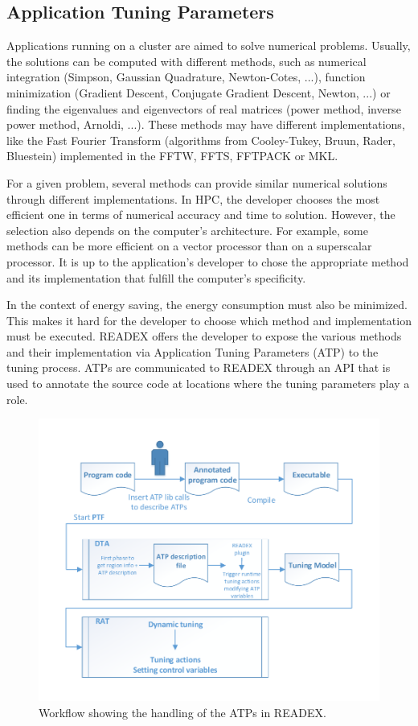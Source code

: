 \subsection{Application Tuning Parameters} \label{sec:atp}

Applications running on a cluster are aimed to solve numerical problems. Usually, the solutions can be computed with different methods, such as numerical integration (Simpson, Gaussian Quadrature, Newton-Cotes, ...), function minimization (Gradient Descent, Conjugate Gradient Descent, Newton, ...) or finding the eigenvalues and eigenvectors of real matrices (power method, inverse power method, Arnoldi, ...). These methods may have different implementations, like the Fast Fourier Transform (algorithms from Cooley-Tukey, Bruun, Rader, Bluestein) implemented in the FFTW, FFTS, FFTPACK or MKL.

For a given problem, several methods can provide similar numerical solutions through different implementations. In HPC, the developer chooses the most efficient one in terms of numerical accuracy and time to solution. However, the selection also depends on the computer's architecture. For example, some methods can be more efficient on a vector processor than on a superscalar processor. It is up to the application's developer to chose the appropriate method and its implementation that fulfill the computer's specificity.

In the context of energy saving, the energy consumption must also be minimized. This makes it hard for the developer to choose which method and implementation must be executed. READEX offers the developer to expose the various methods and their implementation via Application Tuning Parameters (ATP) to the tuning process. ATPs are communicated to READEX through an API that is used to annotate the source code at locations where the tuning parameters play a role.

\begin{figure}
\centering
\includegraphics[width=0.8\columnwidth]{figures/overall_design.pdf} 
\caption{Workflow showing the handling of the ATPs in READEX. }
\label{fig_ATP_workflow}
\end{figure} 

